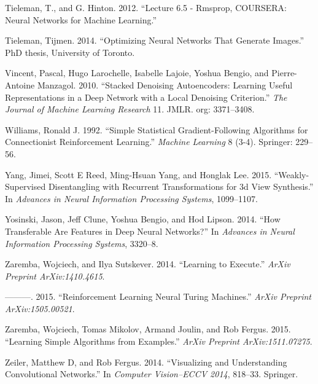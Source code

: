 \documentclass[12pt,twoside]{mitthesis}
\begin{document}
\hypertarget{ref-rmsprop}{}
Tieleman, T., and G. Hinton. 2012. ``Lecture 6.5 - Rmsprop, COURSERA:
Neural Networks for Machine Learning.''

\hypertarget{ref-tieleman2014optimizing}{}
Tieleman, Tijmen. 2014. ``Optimizing Neural Networks That Generate
Images.'' PhD thesis, University of Toronto.

\hypertarget{ref-vincent2010stacked}{}
Vincent, Pascal, Hugo Larochelle, Isabelle Lajoie, Yoshua Bengio, and
Pierre-Antoine Manzagol. 2010. ``Stacked Denoising Autoencoders:
Learning Useful Representations in a Deep Network with a Local Denoising
Criterion.'' \emph{The Journal of Machine Learning Research} 11. JMLR.
org: 3371--3408.

\hypertarget{ref-williams1992simple}{}
Williams, Ronald J. 1992. ``Simple Statistical Gradient-Following
Algorithms for Connectionist Reinforcement Learning.'' \emph{Machine
Learning} 8 (3-4). Springer: 229--56.

\hypertarget{ref-yang2015weakly}{}
Yang, Jimei, Scott E Reed, Ming-Hsuan Yang, and Honglak Lee. 2015.
``Weakly-Supervised Disentangling with Recurrent Transformations for 3d
View Synthesis.'' In \emph{Advances in Neural Information Processing
Systems}, 1099--1107.

\hypertarget{ref-yosinski2014transferable}{}
Yosinski, Jason, Jeff Clune, Yoshua Bengio, and Hod Lipson. 2014. ``How
Transferable Are Features in Deep Neural Networks?'' In \emph{Advances
in Neural Information Processing Systems}, 3320--8.

\hypertarget{ref-zaremba2014learning}{}
Zaremba, Wojciech, and Ilya Sutskever. 2014. ``Learning to Execute.''
\emph{ArXiv Preprint ArXiv:1410.4615}.

\hypertarget{ref-zaremba2015reinforcement}{}
---------. 2015. ``Reinforcement Learning Neural Turing Machines.''
\emph{ArXiv Preprint ArXiv:1505.00521}.

\hypertarget{ref-zaremba2015learning}{}
Zaremba, Wojciech, Tomas Mikolov, Armand Joulin, and Rob Fergus. 2015.
``Learning Simple Algorithms from Examples.'' \emph{ArXiv Preprint
ArXiv:1511.07275}.

\hypertarget{ref-zeiler2014visualizing}{}
Zeiler, Matthew D, and Rob Fergus. 2014. ``Visualizing and Understanding
Convolutional Networks.'' In \emph{Computer Vision--ECCV 2014}, 818--33.
Springer.

\begin{singlespace}

\end{singlespace}

% 
% 
% 
% 
% 
% 
\end{document}
